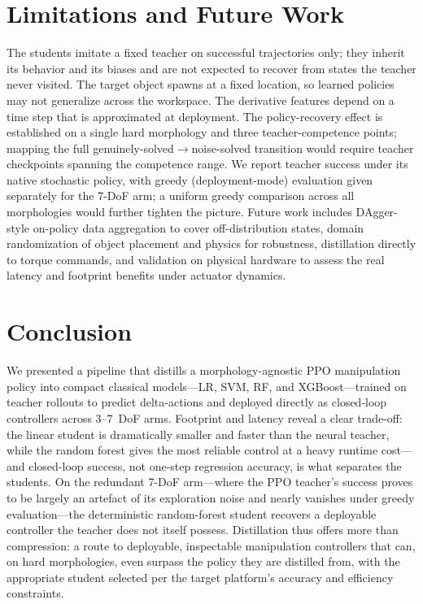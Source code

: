 \documentclass[conference]{IEEEtran}
\begin{document}
\section{Limitations and Future Work}
The students imitate a fixed teacher on successful trajectories only; they inherit
its behavior and its biases and are not expected to recover from states the
teacher never visited. The target object spawns at a fixed location, so learned
policies may not generalize across the workspace. The derivative features depend
on a time step that is approximated at deployment. The policy-recovery effect is
established on a single hard morphology and three teacher-competence points;
mapping the full genuinely-solved$\rightarrow$noise-solved transition would
require teacher checkpoints spanning the competence range. We report teacher
success under its native stochastic policy, with greedy (deployment-mode)
evaluation given separately for the 7-DoF arm; a uniform greedy comparison across
all morphologies would further tighten the picture. Future work includes
DAgger-style on-policy data aggregation to cover off-distribution states, domain
randomization of object placement and physics for robustness, distillation
directly to torque commands, and validation on physical hardware to assess the
real latency and footprint benefits under actuator dynamics.

\section{Conclusion}
We presented a pipeline that distills a morphology-agnostic PPO manipulation
policy into compact classical models---LR, SVM, RF, and XGBoost---trained on
teacher rollouts to predict delta-actions and deployed directly as closed-loop
controllers across 3--7~DoF arms. Footprint and latency reveal a clear
trade-off: the linear student is dramatically smaller and faster than the neural
teacher, while the random forest gives the most reliable control at a heavy
runtime cost---and closed-loop success, not one-step regression accuracy, is what
separates the students. On the redundant 7-DoF arm---where the PPO
teacher's success proves to be largely an artefact of its exploration noise and
nearly vanishes under greedy evaluation---the deterministic random-forest student
recovers a deployable controller the teacher does not itself possess. Distillation
thus offers more than compression: a route to deployable, inspectable manipulation
controllers that can, on hard morphologies, even surpass the policy they are
distilled from, with the appropriate student selected per the target platform's
accuracy and efficiency constraints.
\end{document}
